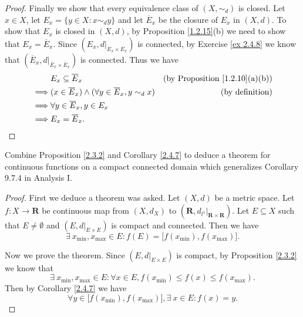 \begin{proof}
    Finally we show that every equivalence class of \((X, \sim_d)\) is closed.
    Let \(x \in X\), let \(E_x = \{y \in X : x \sim_d y\}\) and let \(\overline{E}_x\) be the closure of \(E_x\) in \((X, d)\).
    To show that \(E_x\) is closed in \((X, d)\), by Proposition \ref{1.2.15}(b) we need to show that \(E_x = \overline{E}_x\).
    Since \((E_x, d|_{E_x \times E_x})\) is connected, by Exercise \ref{ex 2.4.8} we know that \((\overline{E}_x, d|_{\overline{E}_x \times \overline{E}_x})\) is connected.
    Thus we have
    \begin{align*}
                 & E_x \subseteq \overline{E}_x                                            & \text{(by Proposition \ref{1.2.10}(a)(b))} \\
        \implies & (x \in \overline{E}_x) \land (\forall y \in \overline{E}_x, y \sim_d x) & \text{(by definition)}                     \\
        \implies & \forall y \in \overline{E}_x, y \in E_x                                                                              \\
        \implies & E_x = \overline{E}_x.
    \end{align*}
\end{proof}

\begin{exercise}\label{ex 2.4.10}
    Combine Proposition \ref{2.3.2} and Corollary \ref{2.4.7} to deduce a theorem for continuous functions on a compact connected domain which generalizes Corollary 9.7.4 in Analysis I.
\end{exercise}

\begin{proof}
    First we deduce a theorem was asked.
    Let \((X, d)\) be a metric space.
    Let \(f : X \to \mathbf{R}\) be continuous map from \((X, d_X)\) to \((\mathbf{R}, d_{l^1}|_{\mathbf{R} \times \mathbf{R}})\).
    Let \(E \subseteq X\) such that \(E \neq \emptyset\) and \((E, d|_{E \times E})\) is compact and connected.
    Then we have
    \[
        \exists\ x_{\min}, x_{\max} \in E : f(E) = \big[f(x_{\min}), f(x_{\max})\big].
    \]

    Now we prove the theorem.
    Since \((E, d|_{E \times E})\) is compact, by Proposition \ref{2.3.2} we know that
    \[
        \exists\ x_{\min}, x_{\max} \in E : \forall x \in E, f(x_{\min}) \leq f(x) \leq f(x_{\max}).
    \]
    Then by Corollary \ref{2.4.7} we have
    \[
        \forall y \in \big[f(x_{\min}), f(x_{\max})\big], \exists\ x \in E : f(x) = y.
    \]
\end{proof}